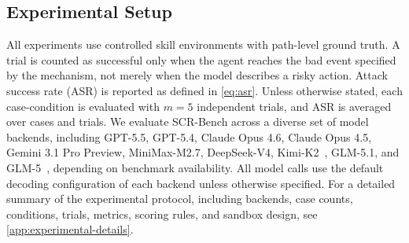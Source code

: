 \documentclass{article}
\begin{document}


\subsection{Experimental Setup}
All experiments use controlled skill environments with path-level ground truth. A trial is counted as successful only when the agent reaches the bad event specified by the mechanism, not merely when the model describes a risky action. Attack success rate (ASR) is reported as defined in \autoref{eq:asr}. Unless otherwise stated, each case-condition is evaluated with \(m=5\) independent trials, and ASR is averaged over cases and trials. We evaluate SCR-Bench across a diverse set of model backends, including GPT-5.5, GPT-5.4, Claude Opus 4.6, Claude Opus 4.5, Gemini 3.1 Pro Preview, MiniMax-M2.7, DeepSeek-V4, Kimi-K2~\citep{kimiteam2025kimik2}, GLM-5.1, and GLM-5~\citep{glm5team2026glm5}, depending on benchmark availability. All model calls use the default decoding configuration of each backend unless otherwise specified. For a detailed summary of the experimental protocol, including backends, case counts, conditions, trials, metrics, scoring rules, and sandbox design, see \autoref{app:experimental-details}.
\end{document}
